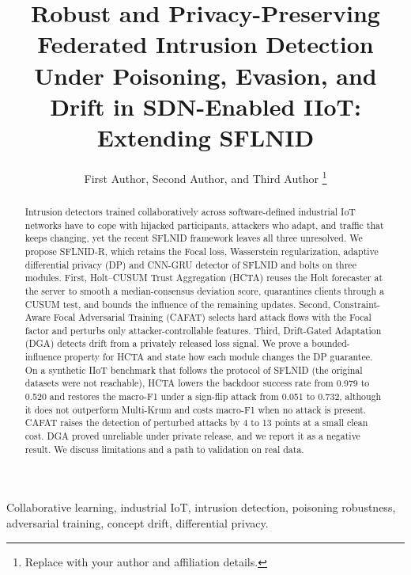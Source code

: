 \documentclass[journal]{IEEEtran}
\begin{document}
\title{Robust and Privacy-Preserving Federated Intrusion Detection Under Poisoning, Evasion, and Drift in SDN-Enabled IIoT: Extending SFLNID}
\author{First Author, Second Author, and Third Author%
\thanks{Replace with your author and affiliation details.}}
\maketitle

\begin{abstract}
Intrusion detectors trained collaboratively across software-defined industrial IoT networks have to cope with hijacked participants, attackers who adapt, and traffic that keeps changing, yet the recent SFLNID framework leaves all three unresolved. We propose SFLNID-R, which retains the Focal loss, Wasserstein regularization, adaptive differential privacy (DP) and CNN-GRU detector of SFLNID and bolts on three modules. First, Holt--CUSUM Trust Aggregation (HCTA) reuses the Holt forecaster at the server to smooth a median-consensus deviation score, quarantines clients through a CUSUM test, and bounds the influence of the remaining updates. Second, Constraint-Aware Focal Adversarial Training (CAFAT) selects hard attack flows with the Focal factor and perturbs only attacker-controllable features. Third, Drift-Gated Adaptation (DGA) detects drift from a privately released loss signal. We prove a bounded-influence property for HCTA and state how each module changes the DP guarantee. On a synthetic IIoT benchmark that follows the protocol of SFLNID (the original datasets were not reachable), HCTA lowers the backdoor success rate from 0.979 to 0.520 and restores the macro-F1 under a sign-flip attack from 0.051 to 0.732, although it does not outperform Multi-Krum and costs macro-F1 when no attack is present. CAFAT raises the detection of perturbed attacks by 4 to 13 points at a small clean cost. DGA proved unreliable under private release, and we report it as a negative result. We discuss limitations and a path to validation on real data.
\end{abstract}

\begin{IEEEkeywords}
Collaborative learning, industrial IoT, intrusion detection, poisoning robustness, adversarial training, concept drift, differential privacy.
\end{IEEEkeywords}
\end{document}
